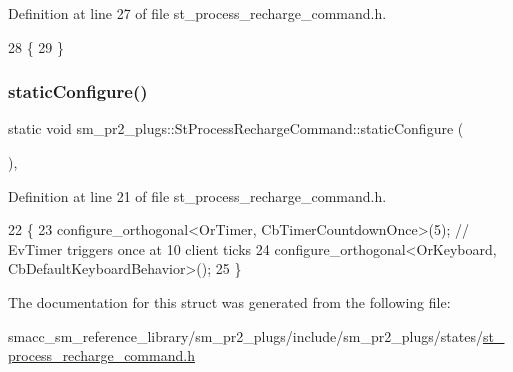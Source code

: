 Definition at line 27 of file st\+\_\+process\+\_\+recharge\+\_\+command.\+h.


\begin{DoxyCode}
28     \{
29     \}
\end{DoxyCode}
\mbox{\label{structsm__pr2__plugs_1_1StProcessRechargeCommand_ad4c6ec976c76402dd0fe6002036d2462}} 
\subsubsection{\texorpdfstring{static\+Configure()}{staticConfigure()}}
{\footnotesize\ttfamily static void sm\+\_\+pr2\+\_\+plugs\+::\+St\+Process\+Recharge\+Command\+::static\+Configure (\begin{DoxyParamCaption}{ }\end{DoxyParamCaption})\hspace{0.3cm}{\ttfamily [inline]}, {\ttfamily [static]}}



Definition at line 21 of file st\+\_\+process\+\_\+recharge\+\_\+command.\+h.


\begin{DoxyCode}
22     \{
23         configure\_orthogonal<OrTimer, CbTimerCountdownOnce>(5); \textcolor{comment}{// EvTimer triggers once at 10 client ticks}
24         configure\_orthogonal<OrKeyboard, CbDefaultKeyboardBehavior>();
25     \}
\end{DoxyCode}


The documentation for this struct was generated from the following file\+:\begin{DoxyCompactItemize}
\item 
smacc\+\_\+sm\+\_\+reference\+\_\+library/sm\+\_\+pr2\+\_\+plugs/include/sm\+\_\+pr2\+\_\+plugs/states/\hyperlink{st__process__recharge__command_8h}{st\+\_\+process\+\_\+recharge\+\_\+command.\+h}\end{DoxyCompactItemize}
